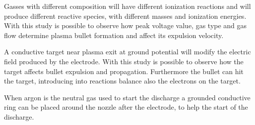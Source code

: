 Gasses with different composition will have different ionization reactions and will produce different reactive species, with different masses and ionization energies. With this study is possible to observe how peak voltage value, gas type and gas flow determine plasma bullet formation and affect its expulsion velocity.

A conductive target near plasma exit at ground potential will modify the electric field produced by the electrode. With this study is possible to observe how the target affects bullet expulsion and propagation. Furthermore the bullet can hit the target, introducing into reactions balance also the electrons on the target.

When argon is the neutral gas used to start the discharge a grounded conductive ring can be placed around the nozzle after the electrode, to help the start of the discharge.
